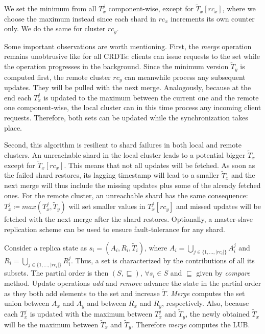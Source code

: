 We set the minimum from all $T_{x}^{j}$ component-wise, except for
$\tilde{T}_{x}[rc_{x}]$, where we choose the maximum instead since each shard in
$rc_{x}$ increments its own counter only. We do the same for cluster $rc_{y}$.

Some important observations are worth mentioning. First, the \textit{merge}
operation remains unobtrusive like for all CRDTs: clients can issue requests to
the set while the operation progresses in the background. Since the minimum
version $\tilde{T}_{y}$ is computed first, the remote cluster $rc_{y}$ can
meanwhile process any subsequent updates. They will be pulled with the next
merge. Analogously, because at the end each $T_{x}^{j}$ is updated to the
maximum between the current one and the remote one component-wise, the local
cluster can in this time process any incoming client requests. Therefore, both
sets can be updated while the synchronization takes place. 

Second, this algorithm is resilient to shard failures in both local and remote
clusters. An unreachable shard in the local cluster leads to a potential bigger
$\tilde{T}_{x}$ except for $\tilde{T}_{x}[rc_{x}]$. This means that not all
updates will be fetched. As soon as the failed shard restores, its lagging
timestamp will lead to a smaller $\tilde{T}_{x}$ and the next merge will thus
include the missing updates plus some of the already fetched ones. For the
remote cluster, an unreachable shard has the same consequence: $T_{x}^{j}
\coloneqq max(T_{x}^{j}, \tilde{T}_{y})$ will set smaller values in
$T_{x}^{j}[rc_{y}]$ and missed updates will be fetched with the next merge after
the shard restores. Optionally, a master-slave replication scheme can be used to
ensure fault-tolerance for any shard.

\begin{IEEEproof}
Consider a replica state as $s_{i} = (A_{i}, R_{i}, \tilde{T}_{i})$, where
$A_{i} = \bigcup_{j \in \{1,\ldots,|rc_{i}|\}} A_{i}^{j}$ and $R_{i} =
\bigcup_{j \in \{1,\ldots,|rc_{i}|\}} R_{i}^{j}$. Thus, a set is characterized
by the contributions of all its subsets. The partial order is then $(S,
\sqsubseteq)$, $\forall s_{i} \in S$ and $\sqsubseteq$ given by \textit{compare}
method. Update operations \textit{add} and \textit{remove} advance the state in
the partial order as they both add elements to the set and increase $\tilde{T}$.
\textit{Merge} computes the set union between $A_{x}$ and $A_{y}$ and between
$R_{x}$ and $R_{y}$, respectively. Also, because each $T_{x}^{j}$ is updated
with the maximum between $T_{x}^{j}$ and $\tilde{T}_{y}$, the newly obtained
$\tilde{T}_{x}$ will be the maximum between $\tilde{T}_{x}$ and $\tilde{T}_{y}$.
Therefore \textit{merge} computes the LUB.
\end{IEEEproof}